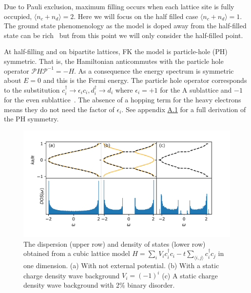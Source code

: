 Due to Pauli exclusion, maximum filling occurs when each lattice site is fully occupied, \(\langle n_c + n_d \rangle = 2\). Here we will focus on the half filled case \(\langle n_c + n_d \rangle = 1\). The ground state phenomenology as the model is doped away from the half-filled state can be rich~\autocite{jedrzejewskiFalicovKimballModels2001,gruberGroundStatesSpinless1990} but from this point we will only consider the half-filled point.

At half-filling and on bipartite lattices, FK the model is particle-hole (PH) symmetric. That is, the Hamiltonian anticommutes with the particle hole operator \(\mathcal{P}H\mathcal{P}^{-1} = -H\). As a consequence the energy spectrum is symmetric about \(E = 0\) and this is the Fermi energy. The particle hole operator corresponds to the substitution \(c^\dagger_i \rightarrow \epsilon_i c_i, d^\dagger_i \rightarrow d_i\) where \(\epsilon_i = +1\) for the A sublattice and \(-1\) for the even sublattice~\autocite{gruberFalicovKimballModel2005}. The absence of a hopping term for the heavy electrons means they do not need the factor of \(\epsilon_i\). See appendix \protect\hyperlink{particle-hole-symmetry}{A.1} for a full derivation of the PH symmetry.

\hypertarget{fig:simple_DOS}{%
\begin{figure}
\centering
\includegraphics[width=1\textwidth,height=\textheight]{figure_code/background_chapter/simple_DOS}
\caption[{Cubic Lattice dispersion with disorder}]{The dispersion (upper row) and density of states (lower row) obtained from a cubic lattice model \(H = \sum_{i} V_i c^\dagger_{i}c_{i} - t \sum_{\langle i,j\rangle} c^\dagger_{i}c_{j}\) in one dimension. (a) With not external potential. (b) With a static charge density wave background \(V_i = (-1)^i\) (c) A static charge density wave background with 2\% binary disorder.}
\label{fig:simple_DOS}
\end{figure}
}

